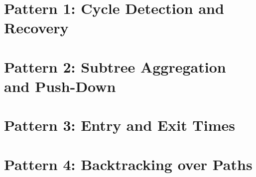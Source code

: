 \clearpage
\section{Pattern 1: Cycle Detection and Recovery}
\label{sec:ch2-p1}





\clearpage
\section{Pattern 2: Subtree Aggregation and Push-Down}
\label{sec:ch2-p2}






\clearpage
\section{Pattern 3: Entry and Exit Times}
\label{sec:ch2-p3}






\clearpage
\section{Pattern 4: Backtracking over Paths}
\label{sec:ch2-p4}





\clearpage
